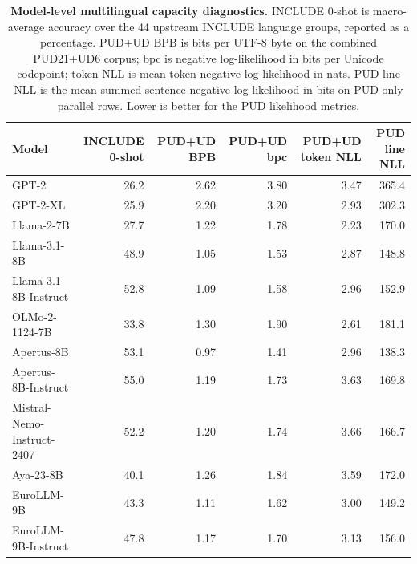 \begin{table}[t]
\centering
\small
\begin{tabular}{lrrrrr}
\toprule
\textbf{Model} & \textbf{INCLUDE 0-shot} & \textbf{PUD+UD BPB} & \textbf{PUD+UD bpc} & \textbf{PUD+UD token NLL} & \textbf{PUD line NLL} \\
\midrule
GPT-2 \citep{radford2019gpt2} & 26.2 & 2.62 & 3.80 & 3.47 & 365.4 \\
GPT-2-XL & 25.9 & 2.20 & 3.20 & 2.93 & 302.3 \\
Llama-2-7B \citep{touvron2023llama2} & 27.7 & 1.22 & 1.78 & 2.23 & 170.0 \\
Llama-3.1-8B \citep{grattafiori2024llama3herdmodels} & 48.9 & 1.05 & 1.53 & 2.87 & 148.8 \\
Llama-3.1-8B-Instruct & 52.8 & 1.09 & 1.58 & 2.96 & 152.9 \\
OLMo-2-1124-7B \citep{walsh2025olmo2} & 33.8 & 1.30 & 1.90 & 2.61 & 181.1 \\
Apertus-8B \citep{apertus2025apertus} & 53.1 & 0.97 & 1.41 & 2.96 & 138.3 \\
Apertus-8B-Instruct & 55.0 & 1.19 & 1.73 & 3.63 & 169.8 \\
Mistral-Nemo-Instruct-2407 \citep{mistralai2024mistralnemo} & 52.2 & 1.20 & 1.74 & 3.66 & 166.7 \\
Aya-23-8B \citep{aryabumi2024aya23} & 40.1 & 1.26 & 1.84 & 3.59 & 172.0 \\
EuroLLM-9B \citep{martins2025eurollm} & 43.3 & 1.11 & 1.62 & 3.00 & 149.2 \\
EuroLLM-9B-Instruct & 47.8 & 1.17 & 1.70 & 3.13 & 156.0 \\
\bottomrule
\end{tabular}
\caption{\textbf{Model-level multilingual capacity diagnostics.} INCLUDE 0-shot is macro-average accuracy over the 44 upstream INCLUDE language groups, reported as a percentage. PUD+UD BPB is bits per UTF-8 byte on the combined PUD21+UD6 corpus; bpc is negative log-likelihood in bits per Unicode codepoint; token NLL is mean token negative log-likelihood in nats. PUD line NLL is the mean summed sentence negative log-likelihood in bits on PUD-only parallel rows. Lower is better for the PUD likelihood metrics.}
\label{tab:model-include-scores}
\end{table}
